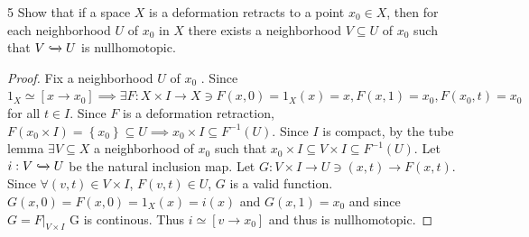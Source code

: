\documentclass{article}
\newcommand*{\subeq}{\subseteq}
\begin{document}
\bigskip

\begin{claim}{5}\label{Claim 5.}
    Show that if a space $X$ is a deformation retracts to a point $x_0 \in X$, then for each neighborhood $U$ of $x_0$ in $X$ there exists a neighborhood $V \subeq U$ of $x_0$ such that $V \xhookrightarrow{} U$ is nullhomotopic.          
\end{claim}
\begin{proof}
    Fix a neighborhood $U$ of $x_0$ . Since $1_X \simeq [x \to x_0] \implies \exists F: X \times I \to X \ni F(x, 0) = 1_X(x) = x, F(x, 1) = x_0, F(x_0, t) = x_0$ for all $t \in I$. Since $F$ is a deformation retraction, $F(x_0 \times I) = \left\{ x_0 \right\} \subeq U \implies x_0 \times I \subeq F^{-1}(U)$. Since $I$ is compact, by the tube lemma $\exists V \subeq X$ a neighborhood of $x_0$ such that $x_0 \times I \subeq V \times I \subeq F^{-1}(U)$. Let $i: V \xhookrightarrow{} U$ be the natural inclusion map. Let $G: V \times I \to U \ni (x, t) \to F(x, t)$. Since $\forall (v, t) \in V \times I$, $F(v, t) \in U$, $G$ is a valid function. $G(x, 0) = F(x, 0) = 1_X(x) = i(x)$ and $G(x, 1) = x_0$ and since $G = F|_{V \times I}$ G is continous. Thus $i \simeq [v \to x_0]$ and thus is nullhomotopic.                     
\end{proof}

\bigskip
\end{document}
